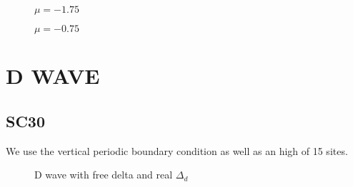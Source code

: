 \documentclass[../main.tex]{subfiles}
\begin{document}
\begin{figure}[H]
    
    \caption{$\mu = -1.75$}
\end{figure}
\begin{figure}[H]
    
    \caption{$\mu = -0.75$}
\end{figure}

\section{D WAVE}

\subsection{SC30}
We use the vertical periodic boundary condition as well as an high of 15 sites.
\begin{figure}[H]
    
    \caption{D wave with free delta and real $\Delta_d$}
\end{figure}
\end{document}
